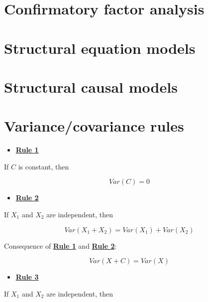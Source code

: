\documentclass[
]{book}
\providecommand{\tightlist}{%
  \setlength{\itemsep}{0pt}\setlength{\parskip}{0pt}}
\begin{document}
\hypertarget{cfa}{%
\chapter{Confirmatory factor analysis}\label{cfa}}

\hypertarget{sem}{%
\chapter{Structural equation models}\label{sem}}

\hypertarget{scm}{%
\chapter{Structural causal models}\label{scm}}

\hypertarget{appendix-appendix}{%
\appendix}


\hypertarget{appendix-rules}{%
\chapter{Variance/covariance rules}\label{appendix-rules}}

\begin{itemize}
\tightlist
\item
  \href{./variance.html\#Rule1}{\textbf{Rule 1}}
\end{itemize}

If \(C\) is constant, then

\[
Var\left(C\right) = 0
\]

\begin{itemize}
\tightlist
\item
  \href{./variance.html\#Rule2}{\textbf{Rule 2}}
\end{itemize}

If \(X_{1}\) and \(X_{2}\) are independent, then

\[
Var\left(X_{1} + X_{2}\right) =
Var\left(X_{1}\right) + Var\left(X_{2}\right)
\]

Consequence of \href{./variance.html\#Rule1}{\textbf{Rule 1}} and \href{./variance.html\#Rule2}{\textbf{Rule 2}}:

\[
Var\left(X + C\right) = Var\left(X\right)
\]

\begin{itemize}
\tightlist
\item
  \href{./variance.html\#Rule3}{\textbf{Rule 3}}
\end{itemize}

If \(X_{1}\) and \(X_{2}\) are independent, then
\end{document}
